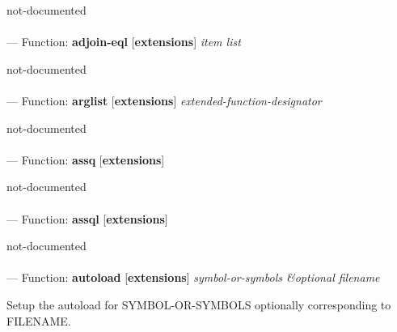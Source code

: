 \begin{adjustwidth}{5em}{5em}
not-documented
\end{adjustwidth}

\paragraph{}
\label{EXTENSIONS:ADJOIN-EQL}
--- Function: \textbf{adjoin-eql} [\textbf{extensions}] \textit{item list}

\begin{adjustwidth}{5em}{5em}
not-documented
\end{adjustwidth}

\paragraph{}
\label{EXTENSIONS:ARGLIST}
--- Function: \textbf{arglist} [\textbf{extensions}] \textit{extended-function-designator}

\begin{adjustwidth}{5em}{5em}
not-documented
\end{adjustwidth}

\paragraph{}
\label{EXTENSIONS:ASSQ}
--- Function: \textbf{assq} [\textbf{extensions}] \textit{}

\begin{adjustwidth}{5em}{5em}
not-documented
\end{adjustwidth}

\paragraph{}
\label{EXTENSIONS:ASSQL}
--- Function: \textbf{assql} [\textbf{extensions}] \textit{}

\begin{adjustwidth}{5em}{5em}
not-documented
\end{adjustwidth}

\paragraph{}
\label{EXTENSIONS:AUTOLOAD}
--- Function: \textbf{autoload} [\textbf{extensions}] \textit{symbol-or-symbols \&optional filename}

\begin{adjustwidth}{5em}{5em}
Setup the autoload for SYMBOL-OR-SYMBOLS optionally corresponding to FILENAME.
\end{adjustwidth}


